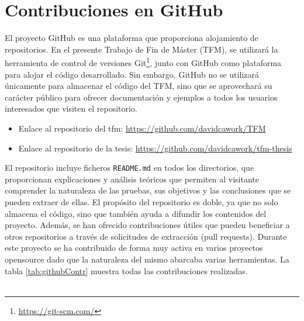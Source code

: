 \section{Contribuciones en GitHub}
\label{sec:estadoArte_github}


El proyecto GitHub es una plataforma que proporciona alojamiento de repositorios. En el presente Trabajo de Fin de Máster (TFM), se utilizará la herramienta de control de versiones Git\footnote{\url{https://git-scm.com/}}, junto con GitHub como plataforma para alojar el código desarrollado. Sin embargo, GitHub no se utilizará únicamente para almacenar el código del TFM, sino que se aprovechará su carácter público para ofrecer documentación y ejemplos a todos los usuarios interesados que visiten el repositorio. \\
\par
\begin{itemize}
    \item Enlace al repositorio del \gls{tfm}: \url{https://github.com/davidcawork/TFM}
    \item Enlace al repositorio de la tesis: \url{https://github.com/davidcawork/tfm-thesis}
\end{itemize}
\vspace{0.5cm}

El repositorio incluye ficheros \texttt{README.md} en todos los directorios, que proporcionan explicaciones y análisis teóricos que permiten al visitante comprender la naturaleza de las pruebas, sus objetivos y las conclusiones que se pueden extraer de ellas. El propósito del repositorio es doble, ya que no solo almacena el código, sino que también ayuda a difundir los contenidos del proyecto. Además, se han ofrecido contribuciones útiles que pueden beneficiar a otros repositorios a través de solicitudes de extracción (pull requests). Durante este proyecto se ha contribuido de forma muy activa en varios proyectos opensource dado que la naturaleza del mismo abarcaba varias herramientas.  La tabla \ref{tab:githubContr} muestra todas las contribuciones realizadas.\\
\\

